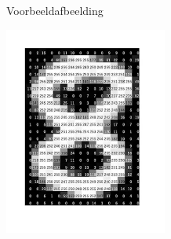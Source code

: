 \documentclass[aspectratio=169]{beamer}
\begin{document}
\begin{frame}{Voorbeeldafbeelding}
\begin{center}
	\includegraphics[width=0.4\textwidth]{graphics/eight-pixels.png}
\end{center}
\end{frame}
\end{document}
